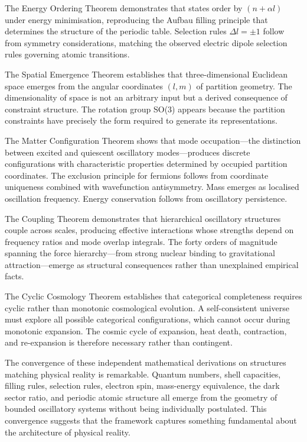 \documentclass[11pt,a4paper]{article}
\theoremstyle{remark}
\begin{document}
The Energy Ordering Theorem demonstrates that states order by $(n + \alpha l)$ under energy minimisation, reproducing the Aufbau filling principle that determines the structure of the periodic table. Selection rules $\Delta l = \pm 1$ follow from symmetry considerations, matching the observed electric dipole selection rules governing atomic transitions.

The Spatial Emergence Theorem establishes that three-dimensional Euclidean space emerges from the angular coordinates $(l, m)$ of partition geometry. The dimensionality of space is not an arbitrary input but a derived consequence of constraint structure. The rotation group SO(3) appears because the partition constraints have precisely the form required to generate its representations.

The Matter Configuration Theorem shows that mode occupation—the distinction between excited and quiescent oscillatory modes—produces discrete configurations with characteristic properties determined by occupied partition coordinates. The exclusion principle for fermions follows from coordinate uniqueness combined with wavefunction antisymmetry. Mass emerges as localised oscillation frequency. Energy conservation follows from oscillatory persistence.

The Coupling Theorem demonstrates that hierarchical oscillatory structures couple across scales, producing effective interactions whose strengths depend on frequency ratios and mode overlap integrals. The forty orders of magnitude spanning the force hierarchy---from strong nuclear binding to gravitational attraction---emerge as structural consequences rather than unexplained empirical facts.

The Cyclic Cosmology Theorem establishes that categorical completeness requires cyclic rather than monotonic cosmological evolution. A self-consistent universe must explore all possible categorical configurations, which cannot occur during monotonic expansion. The cosmic cycle of expansion, heat death, contraction, and re-expansion is therefore necessary rather than contingent.

The convergence of these independent mathematical derivations on structures matching physical reality is remarkable. Quantum numbers, shell capacities, filling rules, selection rules, electron spin, mass-energy equivalence, the dark sector ratio, and periodic atomic structure all emerge from the geometry of bounded oscillatory systems without being individually postulated. This convergence suggests that the framework captures something fundamental about the architecture of physical reality.
\end{document}
